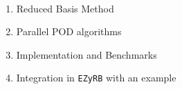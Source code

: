 \begin{frame}{~}
	\Large{}

	\vspace{0.2cm}
	\hspace{0.5cm}
	\begin{minipage}[t]{0.7\textwidth}
		\begin{enumerate}
			\item Reduced Basis Method
			\item Parallel POD algorithms
			\item Implementation and Benchmarks
			\item Integration in \texttt{EZyRB} with an example
		\end{enumerate}
		
	\end{minipage}	


	
	
\end{frame}

